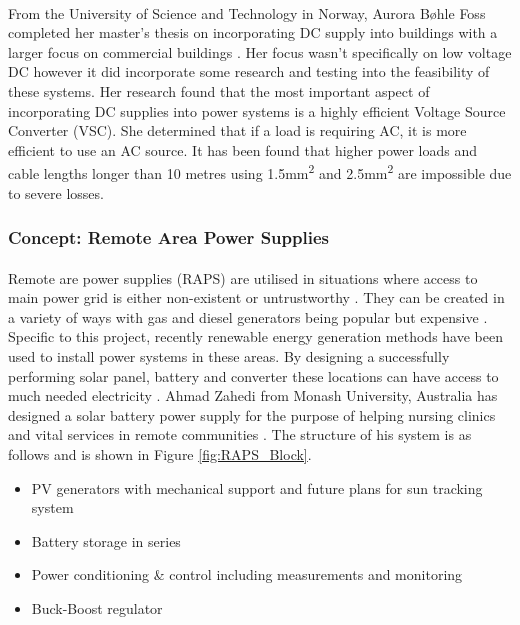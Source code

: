 \paragraph{}
From the University of Science and Technology in Norway, Aurora Bøhle Foss completed her master's thesis on incorporating DC supply into buildings with a larger focus on commercial buildings \cite{Foss2014}. Her focus wasn't specifically on low voltage DC however it did incorporate some research and testing into the feasibility of these systems. Her research found that the most important aspect of incorporating DC supplies into power systems is a highly efficient Voltage Source Converter (VSC). She determined that if a load is requiring AC, it is more efficient to use an AC source. It has been found that higher power loads and cable lengths longer than 10 metres using  1.5\si{mm^2} and  2.5\si{mm^2} are impossible due to severe losses.

\subsubsection{Concept: Remote Area Power Supplies}

\paragraph{}
Remote are power supplies (RAPS) are utilised in situations where access to main power grid is either non-existent or untrustworthy \cite{Mendis2010}. They can be created in a variety of ways with gas and diesel generators being popular but expensive \cite{Mendis2010}. Specific to this project, recently renewable energy generation methods have been used to install power systems in these areas. By designing a successfully performing solar panel, battery and converter these locations can have access to much needed electricity \cite{Zahedi}. Ahmad Zahedi from Monash University, Australia has designed a solar battery power supply for the purpose of helping nursing clinics and vital services in remote communities \cite{Zahedi}. The structure of his system is as follows and is shown in Figure \ref{fig:RAPS_Block}.

\begin{itemize}[noitemsep]
\item PV generators with mechanical support and future plans for sun tracking system
\item Battery storage in series
\item Power conditioning \& control including measurements and monitoring
\item Buck-Boost regulator
\end{itemize}  

